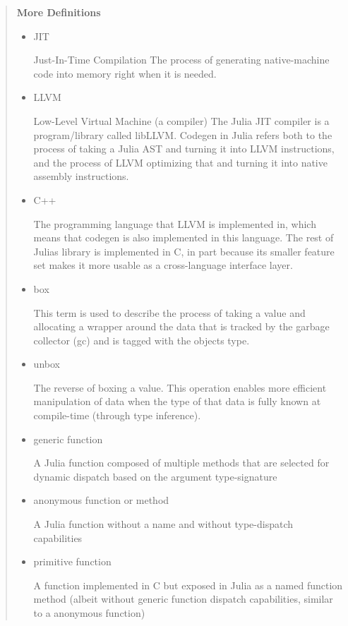 \begin{quote}
\textbf{More Definitions}

\begin{itemize}
\item JIT

Just-In-Time Compilation The process of generating native-machine code into memory right when it is needed.


\item LLVM

Low-Level Virtual Machine (a compiler) The Julia JIT compiler is a program/library called libLLVM. Codegen in Julia refers both to the process of taking a Julia AST and turning it into LLVM instructions, and the process of LLVM optimizing that and turning it into native assembly instructions.


\item C++

The programming language that LLVM is implemented in, which means that codegen is also implemented in this language. The rest of Julia{\textquotesingle}s library is implemented in C, in part because its smaller feature set makes it more usable as a cross-language interface layer.


\item box

This term is used to describe the process of taking a value and allocating a wrapper around the data that is tracked by the garbage collector (gc) and is tagged with the object{\textquotesingle}s type.


\item unbox

The reverse of boxing a value. This operation enables more efficient manipulation of data when the type of that data is fully known at compile-time (through type inference).


\item generic function

A Julia function composed of multiple {\textquotedbl}methods{\textquotedbl} that are selected for dynamic dispatch based on the argument type-signature


\item anonymous function or {\textquotedbl}method{\textquotedbl}

A Julia function without a name and without type-dispatch capabilities


\item primitive function

A function implemented in C but exposed in Julia as a named function {\textquotedbl}method{\textquotedbl} (albeit without generic function dispatch capabilities, similar to a anonymous function)



\end{itemize}
\end{quote}
